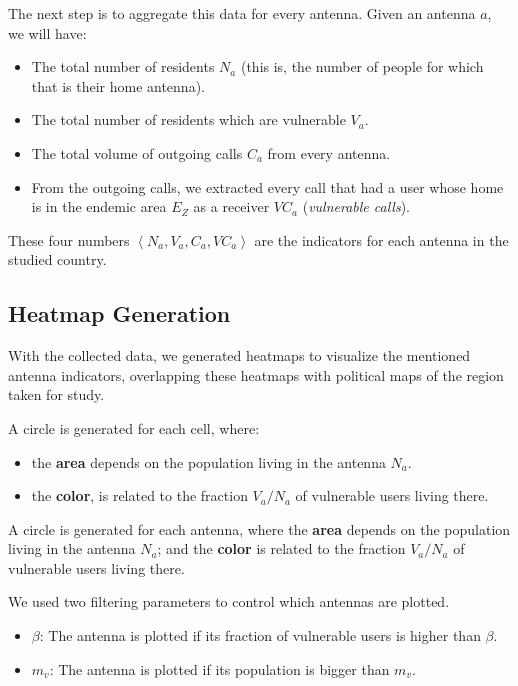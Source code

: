 The next step is to aggregate this data for every antenna. Given an antenna $a$, we will have:
\begin{itemize}
	\item The total number of residents $N_a$ (this is, the number of people for which that is their home antenna).
	\item The total number of residents which are vulnerable $V_a$.
	\item The total volume of outgoing calls $C_a$ from every antenna.
	\item From the outgoing calls, we extracted every call that had a user whose home is in the endemic area $E_Z$ as a receiver $VC_a$ (\textit{vulnerable calls}).
\end{itemize}

These four numbers $\left< N_a, V_a, C_a, VC_a \right>$ are the indicators for each antenna in the studied country.



\subsection{Heatmap Generation}
With the collected data, we generated heatmaps to visualize the mentioned antenna indicators, overlapping these heatmaps with political maps of the region taken for study.

A circle is generated for each cell, where:
\begin{itemize}
	\item the \textbf{area} depends on the population living in the antenna $N_a$.
	\item the \textbf{color}, is related to the fraction ${V_a}/{N_a}$ of vulnerable users living there.
\end{itemize}

A circle is generated for each antenna, where
the \textbf{area} depends on the population living in the antenna $N_a$;
and the \textbf{color} is related to the fraction ${V_a}/{N_a}$ of vulnerable users living there.

We used two filtering parameters to control which antennas are plotted.
\begin{itemize}
	\item $\beta$: The antenna is plotted if its fraction of vulnerable users is higher than $\beta$.
	\item $m_v$: The antenna is plotted if its population is bigger than $m_v$.
\end{itemize}

